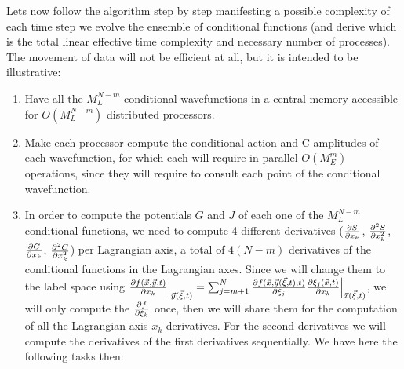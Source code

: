 \documentclass[11pt, a4paper]{article} %
\begin{document}
Lets now follow the algorithm step by step manifesting a possible complexity of each time step we evolve the ensemble of conditional functions (and derive which is the total linear effective time complexity and necessary number of processes). The movement of data will not be efficient at all, but it is intended to be illustrative:
\begin{enumerate}
\item Have all the $M_L^{N-m}$ conditional wavefunctions in a central memory accessible for $O(M_L^{N-m})$ distributed processors.
\item Make each processor compute the conditional action and C amplitudes of each wavefunction, for which each will require in parallel $O(M_E^m)$ operations, since they will require to consult each point of the conditional wavefunction.
\item In order to compute the potentials $G$ and $J$ of each one of the $M_L^{N-m}$ conditional functions, we need to compute 4 different derivatives ($\pdv{S}{x_k}$, $\pdv[2]{S}{x_k}$, $\pdv{C}{x_k}$, $\pdv[2]{C}{x_k}$) per Lagrangian axis, a total of $4(N-m)$ derivatives of the conditional functions in the Lagrangian axes. Since we will change them to the label space using $\pdv{f(\vec{x}, \vec{y},t)}{x_k}\Big\rvert_{\vec{y}(\vec{\xi},t)}=\sum_{j=m+1}^N \pdv{f(\vec{x},\vec{y}(\vec{\xi},t),t)}{\xi_j} \pdv{\xi_j(\vec{x},t)}{x_k}\Big\rvert_{\vec{x}(\vec{\xi},t)}$, we will only compute the $\pdv{f}{\xi_k}$ once, then we will share them for the computation of all the Lagrangian axis $x_k$ derivatives. For the second derivatives we will compute the derivatives of the first derivatives sequentially. We have here the following tasks then:
\begin{enumerate}

\end{enumerate}
\end{enumerate}
\end{document}
